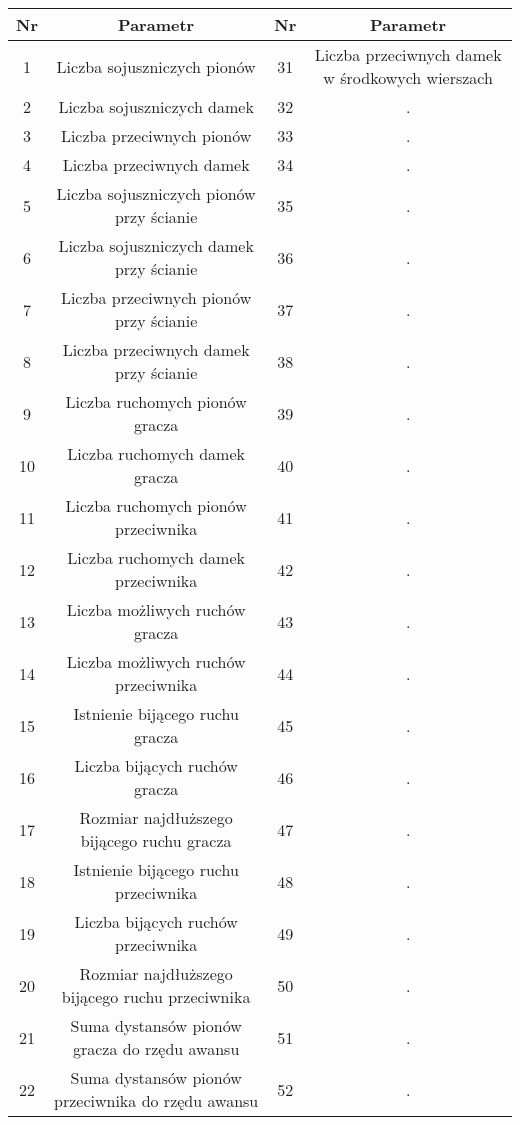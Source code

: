 {
\begin{center}
\begin{table}
\centering
{\footnotesize
\begin{tabular}{|c | c || c | c|}
 \hline
 Nr & Parametr & Nr & Parametr \\ %
 \hline\hline
 1 & Liczba sojuszniczych pionów & 31 & Liczba przeciwnych damek w środkowych wierszach \\ 
 \hline
 2 & Liczba sojuszniczych damek & 32 & . \\
 \hline
 3 & Liczba przeciwnych pionów & 33 & . \\
 \hline
 4 & Liczba przeciwnych damek & 34 & . \\
 \hline
 5 & Liczba sojuszniczych pionów przy ścianie & 35 & . \\
 \hline
 6 & Liczba sojuszniczych damek przy ścianie & 36 & . \\ 
 \hline
 7 & Liczba przeciwnych pionów przy ścianie & 37 & . \\
 \hline
 8 & Liczba przeciwnych damek przy ścianie & 38 & . \\
 \hline
 9 & Liczba ruchomych pionów gracza & 39 & . \\
 \hline
 10 & Liczba ruchomych damek gracza & 40 & . \\
 \hline
 11 & Liczba ruchomych pionów przeciwnika & 41 & . \\ 
 \hline
 12 & Liczba ruchomych damek przeciwnika & 42 & . \\
 \hline
 13 & Liczba możliwych ruchów gracza & 43 & . \\
 \hline
 14 & Liczba możliwych ruchów przeciwnika & 44 & . \\
 \hline
 15 & Istnienie bijącego ruchu gracza & 45 & . \\
 \hline
 16 & Liczba bijących ruchów gracza & 46 & . \\ 
 \hline
 17 & Rozmiar najdłuższego bijącego ruchu gracza & 47 & . \\
 \hline
 18 & Istnienie bijącego ruchu przeciwnika & 48 & . \\
 \hline
 19 & Liczba bijących ruchów przeciwnika & 49 & . \\
 \hline
 20 & Rozmiar najdłuższego bijącego ruchu przeciwnika & 50 & . \\
 \hline
 21 & Suma dystansów pionów gracza do rzędu awansu & 51 & . \\ 
 \hline
 22 & Suma dystansów pionów przeciwnika do rzędu awansu & 52 & . \\
 \hline

\end{tabular}}
\end{table}
\end{center}}

